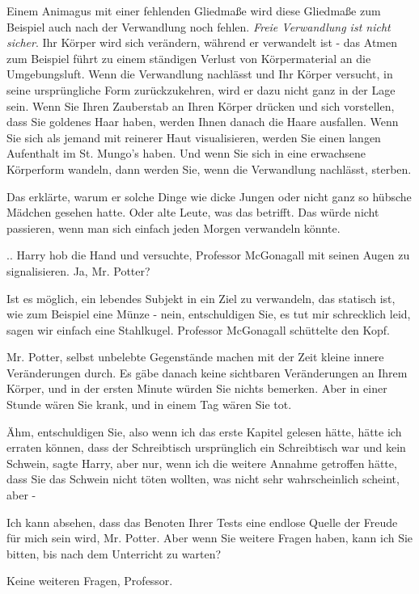 Einem Animagus mit einer fehlenden Gliedmaße wird diese Gliedmaße zum Beispiel
auch nach der Verwandlung noch fehlen. \emph{Freie Verwandlung ist nicht
sicher}. Ihr Körper wird sich verändern, während er verwandelt ist - das Atmen
zum Beispiel führt zu einem ständigen Verlust von Körpermaterial an die
Umgebungsluft. Wenn die Verwandlung nachlässt und Ihr Körper versucht, in seine
ursprüngliche Form zurückzukehren, wird er dazu nicht ganz in der Lage sein.
Wenn Sie Ihren Zauberstab an Ihren Körper drücken und sich vorstellen, dass Sie
goldenes Haar haben, werden Ihnen danach die Haare ausfallen. Wenn Sie sich als
jemand mit reinerer Haut visualisieren, werden Sie einen langen Aufenthalt im
St. Mungo's haben. Und wenn Sie sich in eine erwachsene Körperform wandeln, dann
werden Sie, wenn die Verwandlung nachlässt, sterben.\grqq{}

Das erklärte, warum er solche Dinge wie dicke Jungen oder nicht ganz so hübsche
Mädchen gesehen hatte. Oder alte Leute, was das betrifft. Das würde nicht
passieren, wenn man sich einfach jeden Morgen verwandeln könnte.

.. Harry hob die Hand und versuchte, Professor McGonagall mit seinen Augen zu
signalisieren. \glqq Ja, Mr. Potter?\grqq{}

\glqq Ist es möglich, ein lebendes Subjekt in ein Ziel zu verwandeln, das
statisch ist, wie zum Beispiel eine Münze - nein, entschuldigen Sie, es tut mir
schrecklich leid, sagen wir einfach eine Stahlkugel.\grqq{} Professor McGonagall
schüttelte den Kopf.

\glqq Mr. Potter, selbst unbelebte Gegenstände machen mit der Zeit kleine innere
Veränderungen durch. Es gäbe danach keine sichtbaren Veränderungen an Ihrem
Körper, und in der ersten Minute würden Sie nichts bemerken. Aber in einer
Stunde wären Sie krank, und in einem Tag wären Sie tot.\grqq{}

\glqq Ähm, entschuldigen Sie, also wenn ich das erste Kapitel gelesen hätte,
hätte ich erraten können, dass der Schreibtisch ursprünglich ein Schreibtisch
war und kein Schwein\grqq{}, sagte Harry, \glqq aber nur, wenn ich die weitere
Annahme getroffen hätte, dass Sie das Schwein nicht töten wollten, was nicht
sehr wahrscheinlich scheint, aber -\grqq{}

\glqq Ich kann absehen, dass das Benoten Ihrer Tests eine endlose Quelle der
Freude für mich sein wird, Mr. Potter. Aber wenn Sie weitere Fragen haben, kann
ich Sie bitten, bis nach dem Unterricht zu warten?\grqq{}

\glqq Keine weiteren Fragen, Professor.\grqq{}

